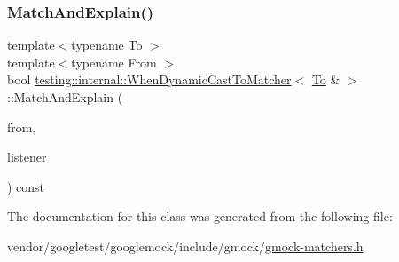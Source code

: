 \subsubsection{\texorpdfstring{Match\+And\+Explain()}{MatchAndExplain()}}
{\footnotesize\ttfamily template$<$typename To $>$ \\
template$<$typename From $>$ \\
bool \hyperlink{classtesting_1_1internal_1_1_when_dynamic_cast_to_matcher}{testing\+::internal\+::\+When\+Dynamic\+Cast\+To\+Matcher}$<$ \hyperlink{classtesting_1_1internal_1_1_to}{To} \& $>$\+::Match\+And\+Explain (\begin{DoxyParamCaption}\item[{From \&}]{from,  }\item[{\hyperlink{classtesting_1_1_match_result_listener}{Match\+Result\+Listener} $\ast$}]{listener }\end{DoxyParamCaption}) const\hspace{0.3cm}{\ttfamily [inline]}}



The documentation for this class was generated from the following file\+:\begin{DoxyCompactItemize}
\item 
vendor/googletest/googlemock/include/gmock/\hyperlink{gmock-matchers_8h}{gmock-\/matchers.\+h}\end{DoxyCompactItemize}
